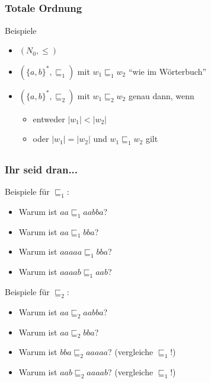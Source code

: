 \subsection*{}
\begin{frame}
  \frametitle{Totale Ordnung}

	\begin{block}{Beispiele}
\begin{itemize}
	\item $( N_0 , \leq )$ \pause
	\item $( \{a, b\}^*, \sqsubseteq_1 )$ mit $w_1 \sqsubseteq_1 w_2$ "`wie im Wörterbuch"' \pause
	\item $( \{a, b\}^*, \sqsubseteq_2 )$ mit $w_1 \sqsubseteq_2 w_2$ genau dann, wenn \pause
		\begin{itemize}
			\item entweder $|w_1| < |w_2|$ \pause
			\item oder $|w_1| = |w_2|$ und $w_1 \sqsubseteq_1 w_2$ gilt
		\end{itemize}
\end{itemize}
	\end{block}
\end{frame}

\subsection*{}
\begin{frame}
  \frametitle{Ihr seid dran...}

	\begin{block}{Beispiele für $\sqsubseteq_1$:}
      \begin{itemize}
        \item  Warum ist $aa \sqsubseteq_1 aabba$? \pause
        \item  Warum ist $aa \sqsubseteq_1 bba$? \pause
        \item  Warum ist $aaaaa \sqsubseteq_1 bba$? \pause
        \item  Warum ist $aaaab \sqsubseteq_1 aab$? \pause
      \end{itemize}
  \end{block}
  \begin{block}{Beispiele für $\sqsubseteq_2$:}
      \begin{itemize}
        \item  Warum ist $aa \sqsubseteq_2 aabba$? \pause
        \item  Warum ist $aa \sqsubseteq_2 bba$? \pause
        \item  Warum ist $bba \sqsubseteq_2 aaaaa$? (vergleiche $\sqsubseteq_1$!)\pause
        \item  Warum ist $aab \sqsubseteq_2 aaaab$? (vergleiche $\sqsubseteq_1$!)
      \end{itemize}
	\end{block}
\end{frame}

